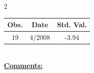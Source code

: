 
\bigskip 
\begin{multicols}{2}{ 
\begin{tabular}{ccc}
\hline  Obs.  &  Date &  Std. Val. \\ 
\hline 
                       19 &        4/2008 &         -3.94 \vspace{-.12in} \\  
 \end{tabular} 
\\ 
 \columnbreak 
 \singlespacing 
 \underline{\textbf{Comments:}} \\ 
 \bigskip       

 } 
\end{multicols} 
